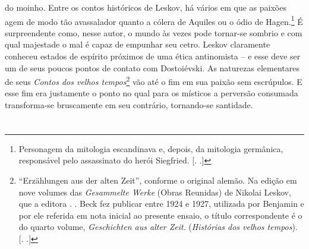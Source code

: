 do moinho. Entre os contos históricos de Leskov, há vários em que as
paixões agem de modo tão avassalador quanto a cólera de Aquiles ou o
ódio de Hagen.\footnote{Personagem da mitologia escandinava e, depois,
  da mitologia germânica, responsável pelo assassinato do herói
  Siegfried. [. .]} É surpreendente como, nesse autor, o mundo
às vezes pode tornar-se sombrio e com qual majestade o mal é capaz de
empunhar seu cetro. Leskov claramente conheceu estados de espírito
próximos de uma ética antinomista -- e esse deve ser um de seus poucos
pontos de contato com Dostoiévski. As naturezas elementares de seus
\emph{Contos dos velhos tempos}\footnote{``Erzählungen aus der alten
  Zeit'', conforme o original alemão. Na edição
  em nove volumes das \emph{Gesammelte Werke} (Obras Reunidas) de
  Nikolai Leskov, que a editora . . Beck fez publicar entre 1924 e
  1927, utilizada por Benjamin e por ele referida em nota inicial ao
  presente ensaio, o título correspondente é o do quarto
  volume, \emph{Geschichten aus alter Zeit}. (\emph{Histórias dos velhos tempos}).
  [. .]} vão até o fim em sua paixão sem escrúpulos. E esse
fim era justamente o ponto no qual para os místicos a perversão
consumada transforma-se bruscamente em seu contrário, tornando-se
santidade.

\section{}

